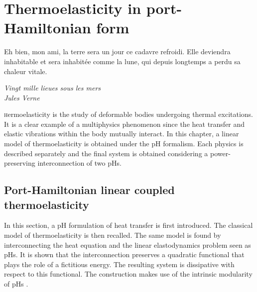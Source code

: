 \chapter{Thermoelasticity in port-Hamiltonian form}

\epigraph{Eh bien, mon ami, la terre sera un jour ce cadavre refroidi. Elle deviendra inhabitable et sera inhabitée comme la lune, qui depuis longtemps a perdu sa chaleur vitale.}{\textit{Vingt mille lieues sous les mers\\
Jules Verne}}
\minitoc
 
\lettrine{\color{theme}{T}}hermoelasticity is the study of deformable bodies undergoing thermal excitations. It is a clear example of a multiphysics phenomenon since the heat transfer and elastic vibrations within the body mutually interact. In this chapter, a linear model of thermoelasticity is obtained under the pH formalism. Each physics is described separately and the final system is obtained considering a power-preserving interconnection of two pHs.

\begin{comment}
The first work on this discipline dates back to \cite{duhamel1837}, but it was only more than a century later, thanks to the paper of Biot \cite{biot1956thermoelasticity}, that research on this topic received a new impulse.
\end{comment}

\section{Port-Hamiltonian linear coupled thermoelasticity}\label{sec:phthel}
In this section, a pH formulation of heat transfer is first introduced. The classical model of thermoelasticity is then recalled. The same model is found by interconnecting the heat equation and the linear elastodynamics problem seen as pHs. It is shown that the interconnection preserves a quadratic functional that plays the role of a fictitious energy. The resulting system is dissipative  with respect to this functional. The construction makes use of the intrinsic modularity of pHs \cite{kurula2010}.

